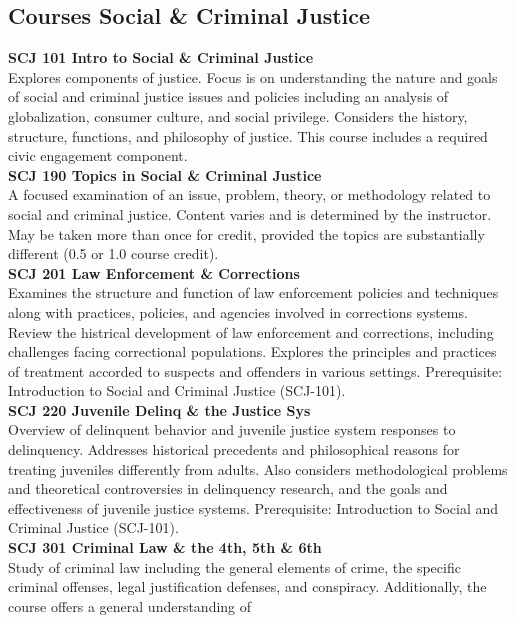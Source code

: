 \documentclass[
  letterpaper,
]{scrbook}
\begin{document}
\subsection{Courses Social \& Criminal
Justice}\label{courses-social-criminal-justice}

\textbf{SCJ 101 Intro to Social \& Criminal Justice}\\
Explores components of justice. Focus is on understanding the nature and
goals of social and criminal justice issues and policies including an
analysis of globalization, consumer culture, and social privilege.
Considers the history, structure, functions, and philosophy of justice.
This course includes a required civic engagement component.\\
\textbf{SCJ 190 Topics in Social \& Criminal Justice}\\
A focused examination of an issue, problem, theory, or methodology
related to social and criminal justice. Content varies and is determined
by the instructor. May be taken more than once for credit, provided the
topics are substantially different (0.5 or 1.0 course credit).\\
\textbf{SCJ 201 Law Enforcement \& Corrections}\\
Examines the structure and function of law enforcement policies and
techniques along with practices, policies, and agencies involved in
corrections systems. Review the histrical development of law enforcement
and corrections, including challenges facing correctional populations.
Explores the principles and practices of treatment accorded to suspects
and offenders in various settings. Prerequisite: Introduction to Social
and Criminal Justice (SCJ-101).\\
\textbf{SCJ 220 Juvenile Delinq \& the Justice Sys}\\
Overview of delinquent behavior and juvenile justice system responses to
delinquency. Addresses historical precedents and philosophical reasons
for treating juveniles differently from adults. Also considers
methodological problems and theoretical controversies in delinquency
research, and the goals and effectiveness of juvenile justice systems.
Prerequisite: Introduction to Social and Criminal Justice (SCJ-101).\\
\textbf{SCJ 301 Criminal Law \& the 4th, 5th \& 6th}\\
Study of criminal law including the general elements of crime, the
specific criminal offenses, legal justification defenses, and
conspiracy. Additionally, the course offers a general understanding of
\end{document}
